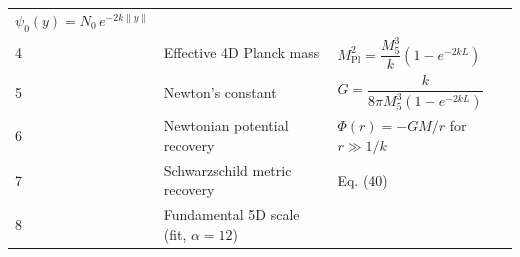 \documentclass[
  11pt,
]{article}
\begin{document}
\begin{longtable}[]{@{}lll@{}}
\begin{minipage}[t]{0.43\columnwidth}
\(\psi_0(y) = N_0\,e^{-2k\|y\|}\)\strut
\end{minipage}\tabularnewline
\begin{minipage}[t]{0.13\columnwidth}\raggedright
4\strut
\end{minipage} & \begin{minipage}[t]{0.35\columnwidth}\raggedright
Effective 4D Planck mass\strut
\end{minipage} & \begin{minipage}[t]{0.43\columnwidth}\raggedright
\(M_{\text{Pl}}^2 = \dfrac{M_5^3}{k}\left(1 - e^{-2kL}\right)\)\strut
\end{minipage}\tabularnewline
\begin{minipage}[t]{0.13\columnwidth}\raggedright
5\strut
\end{minipage} & \begin{minipage}[t]{0.35\columnwidth}\raggedright
Newton's constant\strut
\end{minipage} & \begin{minipage}[t]{0.43\columnwidth}\raggedright
\(G = \dfrac{k}{8\pi M_5^3(1 - e^{-2kL})}\)\strut
\end{minipage}\tabularnewline
\begin{minipage}[t]{0.13\columnwidth}\raggedright
6\strut
\end{minipage} & \begin{minipage}[t]{0.35\columnwidth}\raggedright
Newtonian potential recovery\strut
\end{minipage} & \begin{minipage}[t]{0.43\columnwidth}\raggedright
\(\Phi(r) = -GM/r\) for \(r \gg 1/k\)\strut
\end{minipage}\tabularnewline
\begin{minipage}[t]{0.13\columnwidth}\raggedright
7\strut
\end{minipage} & \begin{minipage}[t]{0.35\columnwidth}\raggedright
Schwarzschild metric recovery\strut
\end{minipage} & \begin{minipage}[t]{0.43\columnwidth}\raggedright
Eq. (40)\strut
\end{minipage}\tabularnewline
\begin{minipage}[t]{0.13\columnwidth}\raggedright
8\strut
\end{minipage} & \begin{minipage}[t]{0.35\columnwidth}\raggedright
Fundamental 5D scale (fit, \(\alpha = 12\))\strut
\end{minipage} & \begin{minipage}[t]{0.43\columnwidth}\raggedright

\end{minipage}
\end{longtable}
\end{document}
